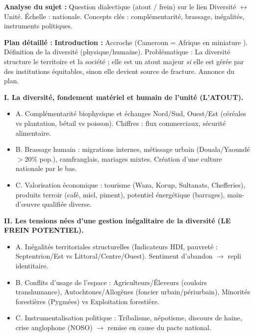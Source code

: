 \documentclass[11pt]{article}
\begin{document}
\begin{exoresolu}
\textbf{Analyse du sujet :} Question dialectique (atout / frein) sur le lien Diversité $\leftrightarrow$ Unité. Échelle : nationale. Concepts clés : complémentarité, brassage, inégalités, instruments politiques.
\par
\textbf{Plan détaillé :}
\textbf{Introduction :} Accroche (Cameroun = \og Afrique en miniature \fg). Définition de la diversité (physique/humaine). Problématique : La diversité structure le territoire et la société ; elle est un atout majeur \emph{si} elle est gérée par des institutions équitables, sinon elle devient source de fracture. Annonce du plan.
\par
\textbf{I. La diversité, fondement matériel et humain de l'unité (L'ATOUT).}
\begin{itemize}
    \item A. Complémentarité biophysique et échanges Nord/Sud, Ouest/Est (céréales vs plantation, bétail vs poisson). Chiffres : flux commerciaux, sécurité alimentaire.
    \item B. Brassage humain : migrations internes, métissage urbain (Douala/Yaoundé $>20\%$ pop.), camfranglais, mariages mixtes. Création d'une \og culture nationale \fg par le bas.
    \item C. Valorisation économique : tourisme (Waza, Korup, Sultanats, Chefferies), produits terroir (café, miel, piment), potentiel énergétique (barrages), main-d'œuvre qualifiée diverse.
\end{itemize}
\par
\textbf{II. Les tensions nées d'une gestion inégalitaire de la diversité (LE FREIN POTENTIEL).}
\begin{itemize}
    \item A. Inégalités territoriales structurelles (Indicateurs HDI, pauvreté : Septentrion/Est vs Littoral/Centre/Ouest). Sentiment d'abandon $\to$ repli identitaire.
    \item B. Conflits d'usage de l'espace : Agriculteurs/Éleveurs (couloirs transhumance), Autochtones/Allogènes (foncier urbain/périurbain), Minorités forestières (Pygmées) vs Exploitation forestière.
    \item C. Instrumentalisation politique : Tribalisme, népotisme, discours de haine, crise anglophone (NOSO) $\to$ remise en cause du pacte national.
\end{itemize}
\par

\end{exoresolu}
\end{document}
